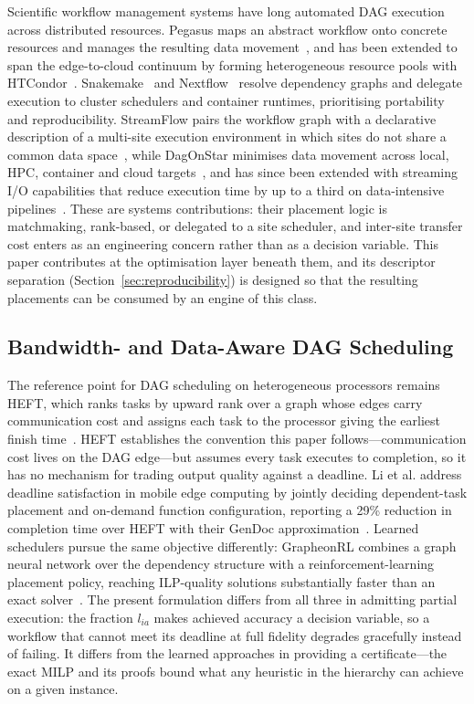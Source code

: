 Scientific workflow management systems have long automated DAG execution across distributed
resources. Pegasus maps an abstract workflow onto concrete resources and manages the resulting data
movement~\cite{deelman2015pegasus}, and has been extended to span the edge-to-cloud continuum by
forming heterogeneous resource pools with HTCondor~\cite{tanaka2022pegasusedge}.
Snakemake~\cite{koster2012snakemake} and Nextflow~\cite{ditommaso2017nextflow} resolve dependency
graphs and delegate execution to cluster schedulers and container runtimes, prioritising
portability and reproducibility. StreamFlow pairs the workflow graph with a declarative description
of a multi-site execution environment in which sites do not share a common data
space~\cite{colonnelli2021streamflow}, while DagOnStar minimises data movement across local, HPC,
container and cloud targets~\cite{sanchezgallegos2021dagonstar}, and has since been extended with
streaming I/O capabilities that reduce execution time by up to a third on data-intensive
pipelines~\cite{perrotta2025streaming}. These are systems contributions: their placement logic is
matchmaking, rank-based, or delegated to a site scheduler, and inter-site transfer cost enters as
an engineering concern rather than as a decision variable. This paper contributes at the
optimisation layer beneath them, and its descriptor separation
(Section~\ref{sec:reproducibility}) is designed so that the resulting placements can be consumed by
an engine of this class.

\subsection{Bandwidth- and Data-Aware DAG Scheduling}
\label{subsec:rw_dag}

The reference point for DAG scheduling on heterogeneous processors remains HEFT, which ranks tasks
by upward rank over a graph whose edges carry communication cost and assigns each task to the
processor giving the earliest finish time~\cite{topcuoglu2002heft}. HEFT establishes the convention
this paper follows---communication cost lives on the DAG edge---but assumes every task executes to
completion, so it has no mechanism for trading output quality against a deadline. Li et al. address
deadline satisfaction in mobile edge computing by jointly deciding dependent-task placement and
on-demand function configuration, reporting a 29\% reduction in completion time over HEFT with
their GenDoc approximation~\cite{li2023dagmec}. Learned schedulers pursue the same objective
differently: GrapheonRL combines a graph neural network over the dependency structure with a
reinforcement-learning placement policy, reaching ILP-quality solutions substantially faster than
an exact solver~\cite{sharma2025grapheonrl}. The present formulation differs from all three in
admitting partial execution: the fraction $l_{ia}$ makes achieved accuracy a decision variable, so
a workflow that cannot meet its deadline at full fidelity degrades gracefully instead of failing.
It differs from the learned approaches in providing a certificate---the exact MILP and its proofs
bound what any heuristic in the hierarchy can achieve on a given instance.

